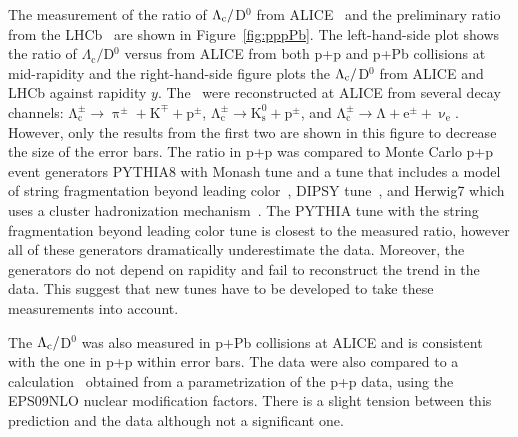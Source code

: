 The measurement of the ratio of ${\Lambda_\text{c}}/$D$^0$ from ALICE~\cite{AliceLcPPPPb} and the preliminary ratio from the LHCb~\cite{LHCbPrompt, LHCbPrivate} are shown in Figure~\ref{fig:pppPb}. The left-hand-side plot shows the ratio of $\Lambda_\mathrm{c}/$D$^0$ versus \pt\@ from ALICE from both p+p and p+Pb collisions at mid-rapidity and the right-hand-side figure plots the ${\Lambda_\text{c}}/$D$^0$ from ALICE and LHCb against rapidity $y$\@. The \Lambdac\ were reconstructed at ALICE from several decay channels: $\mathrm{\Lambda_c^\pm \rightarrow \uppi^\pm + K^\mp + p^\pm}$, $\mathrm{\Lambda_c^\pm \rightarrow K^0_s + p^\pm}$, and $\mathrm{\Lambda_c^\pm \rightarrow \Lambda + e^\pm + \upnu_e}$. However, only the results from the first two are shown in this figure to decrease the size of the error bars.  The ratio in p+p was compared to Monte Carlo p+p event generators PYTHIA8 with Monash tune and a tune that includes a model of string fragmentation beyond leading color~\cite{PYTHIA8strings}, DIPSY tune~\cite{DIPSY}, and Herwig7 which uses a cluster hadronization mechanism~\cite{HERWIG}\@. The PYTHIA tune with the string fragmentation beyond leading color tune is closest to the measured ratio, however all of these generators dramatically underestimate the data. Moreover, the generators do not depend on rapidity and fail to reconstruct the trend in the data. This suggest that new tunes have to be developed to take these measurements into account.

The ${\Lambda_\text{c}}/$D$^0$ was also measured in p+Pb collisions at ALICE and is consistent with the one in p+p within error bars. The data were also compared to a calculation~\cite{LandbergShao} obtained from a parametrization of the p+p data, using the EPS09NLO nuclear modification factors. There is a slight tension between this prediction and the data although not a significant one.




% 

